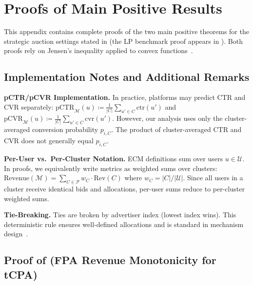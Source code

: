 \documentclass{article}
\theoremstyle{plain}
\theoremstyle{definition}
\theoremstyle{remark}
\newcommand{\cM}{\mathcal{M}}
\newcommand{\cU}{\mathcal{U}}
\newcommand{\cP}{\mathcal{P}}
\newcommand{\pctr}{\text{pCTR}}
\newcommand{\pcvr}{\text{pCVR}}
\begin{document}



\newpage
\appendix
\onecolumn

\section{Proofs of Main Positive Results}
\label{app:proofs}

This appendix contains complete proofs of the two main positive theorems for the strategic auction settings stated in  (the LP benchmark proof appears in ). Both proofs rely on Jensen's inequality applied to convex functions~\citep{hardy1952inequalities}.

\subsection{Implementation Notes and Additional Remarks}
\label{app:implementation}

\textbf{pCTR/pCVR Implementation.} In practice, platforms may predict CTR and CVR separately: $\pctr_\cM(u) \coloneqq \frac{1}{|C|} \sum_{u' \in C} \mathrm{ctr}(u')$ and $\pcvr_\cM(u) \coloneqq \frac{1}{|C|} \sum_{u' \in C} \mathrm{cvr}(u')$. However, our analysis uses only the cluster-averaged conversion probability $p_{i,C}$. The product of cluster-averaged CTR and CVR does not generally equal $p_{i,C}$.

\textbf{Per-User vs.\ Per-Cluster Notation.} ECM definitions sum over users $u \in \cU$. In proofs, we equivalently write metrics as weighted sums over clusters: $\mathrm{Revenue}(\cM) = \sum_{C \in \cP} w_C \cdot \mathrm{Rev}(C)$ where $w_C = |C|/|\cU|$. Since all users in a cluster receive identical bids and allocations, per-user sums reduce to per-cluster weighted sums.

\textbf{Tie-Breaking.} Ties are broken by advertiser index (lowest index wins). This deterministic rule ensures well-defined allocations and is standard in mechanism design~\citep{krishna2009auction}.

\subsection{Proof of  (FPA Revenue Monotonicity for tCPA)}
\end{document}
